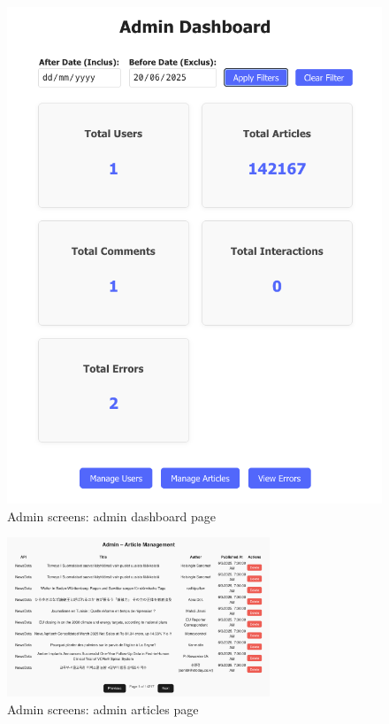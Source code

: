 \begin{figure}[!h]
\begin{minipage}{0.48\linewidth}
    \end{minipage}
    \hfil
    \begin{minipage}{0.48\linewidth}
        \centering
        \includegraphics[width=1\textwidth]{chapters/chapter_03/page/admin/admin-dashboard-page-2}
        \caption{Admin screens: admin dashboard page}
        \label{fig:admin-dashboard-2-wireframes}
    \end{minipage}
\end{figure}


\begin{figure}[!h]
    \centering
    \includegraphics[width=0.7\textwidth]{chapters/chapter_03/page/admin/admin-articles-page}
    \caption{Admin screens: admin articles page}
    \label{fig:admin-articles-wireframes}
\end{figure}

